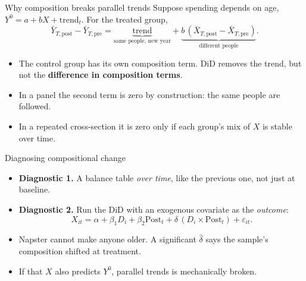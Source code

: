 \documentclass[
  11pt,
  ignorenonframetext,
  aspectratio=169,
]{beamer}
\providecommand{\tightlist}{%
  \setlength{\itemsep}{0pt}\setlength{\parskip}{0pt}}
\begin{document}
\begin{frame}{Why composition breaks parallel trends}
\protect{}\label{why-composition-breaks-parallel-trends}
Suppose spending depends on age, \(Y^0 = a + bX + \text{trend}_t\). For
the treated group, \[
\bar Y_{T,\text{post}} - \bar Y_{T,\text{pre}} = \underbrace{\text{trend}}_{\text{same people, new year}} + \underbrace{b\,(\bar X_{T,\text{post}} - \bar X_{T,\text{pre}})}_{\text{different people}} .
\]

\begin{itemize}
\tightlist
\item
  The control group has its own composition term. DiD removes the trend,
  but not the \textbf{difference in composition terms}.
\item
  In a panel the second term is zero by construction: the same people
  are followed.
\item
  In a repeated cross-section it is zero only if each group's mix of
  \(X\) is stable over time.
\end{itemize}
\end{frame}

\begin{frame}{Diagnosing compositional change}
\protect{}\label{diagnosing-compositional-change}
\begin{itemize}
\tightlist
\item
  \textbf{Diagnostic 1.} A balance table \emph{over time}, like the
  previous one, not just at baseline.
\item
  \textbf{Diagnostic 2.} Run the DiD with an exogenous covariate as the
  \emph{outcome}: \[
  X_{it} = \alpha + \beta_1 D_i + \beta_2 \text{Post}_t + \delta\,(D_i \times \text{Post}_t) + \varepsilon_{it}.
  \]
\item
  Napster cannot make anyone older. A significant \(\hat\delta\) says
  the sample's composition shifted at treatment.
\item
  If that \(X\) also predicts \(Y^0\), parallel trends is mechanically
  broken.
\end{itemize}
\end{frame}
\end{document}
